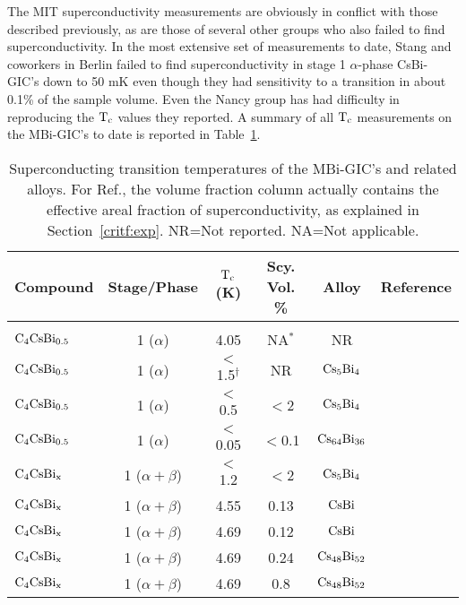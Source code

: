 	The  MIT superconductivity  measurements are obviously  in conflict
with  those described previously\cite{lagrange85},  as are those of several
other          groups      who          also        failed    to       find
superconductivity.\cite{yang88,stang88}   In  the  most  extensive set   of
measurements  to  date,  Stang and  coworkers in  Berlin   failed  to  find
superconductivity in stage 1  $\alpha$-phase  CsBi-GIC's down to 50 mK even
though  they had sensitivity to  a transition in about  0.1\% of the sample
volume.\cite{stang88} Even   the   Nancy   group    has had  difficulty  in
reproducing the $\rm T_c$ values they reported.\cite{lagrange85a} A summary
of  all $\rm  T_c$ measurements on  the MBi-GIC's  to date  is reported  in
Table~\ref{mbi:tc}.

\begin{table}
\caption[Superconducting transition temperatures of the MBi-GIC's and
related alloys.]{Superconducting transition  temperatures of  the MBi-GIC's
and  related   alloys.   For Ref.\cite{E291},   the  volume fraction column
actually contains the  effective  areal  fraction of superconductivity,  as
explained in Section~\ref{critf:exp}. NR=Not reported. NA=Not applicable.}
\label{mbi:tc}
\begin{center}
\begin{tabular}{|lc|cccc|}
\hline
Compound & Stage/Phase & $\rm T_c$ (K) & Scy. Vol. \%  & Alloy & Reference \\
\hline\\
$\rm C_4CsBi_{0.5}$ & 1 ($\alpha$) & 4.05 & NA$^*$ & NR & \cite{mcrae85}\\
$\rm C_4CsBi_{0.5}$ & 1 ($\alpha$) & $<$1.5$^{\dagger}$ & NR & $\rm Cs_5Bi_4$ & \cite{yang88}\\
$\rm C_4CsBi_{0.5}$ & 1 ($\alpha$) & $<$0.5 & $<$2 & $\rm Cs_5Bi_4$& \cite{E291}\\
$\rm C_4CsBi_{0.5}$ & 1 ($\alpha$) & $<$0.05 & $<$0.1 & $\rm Cs_{64}Bi_{36}$& \cite{stang88}\\
$\rm C_4CsBi_{x}$ & 1 ($\alpha + \beta$) & $<$1.2 & $<$2 & $\rm Cs_5Bi_4$ & \cite{E291}\\
$\rm C_4CsBi_{x}$ & 1 ($\alpha + \beta$) & 4.55 & 0.13 & $\rm CsBi$& \cite{stang88}\\
$\rm C_4CsBi_{x}$ & 1 ($\alpha + \beta$) & 4.69 & 0.12 & $\rm CsBi$ & \cite{stang88}\\
$\rm C_4CsBi_{x}$ & 1 ($\alpha + \beta$) & 4.69 & 0.24 & $\rm Cs_{48}Bi_{52}$ & \cite{stang88}\\
$\rm C_4CsBi_{x}$ & 1 ($\alpha + \beta$) & 4.69 & 0.8 & $\rm Cs_{48}Bi_{52}$ & \cite{stang88}\\

\end{tabular}
\end{center}
\end{table}
